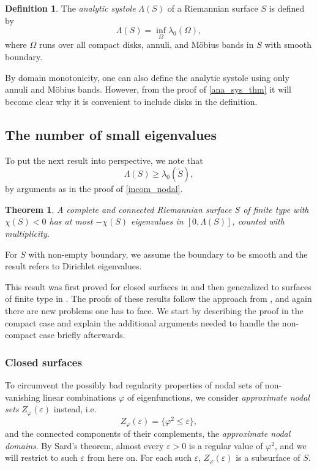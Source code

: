 \documentclass[a4paper,11pt]{amsart}
\numberwithin{equation}{section}
\newtheorem{thm}[equation]{Theorem}
\theoremstyle{definition}
\newtheorem{dfn}[equation]{Definition}
\def\ve{\varepsilon}
\def\vf{\varphi}
\begin{document}
\begin{dfn}
The \emph{analytic systole} $\Lambda(S)$ of a Riemannian surface $S$ is defined by
\begin{equation}
\Lambda(S) = \inf_\Omega \lambda_0(\Omega),
\end{equation}
where $\Omega$ runs over all compact disks, annuli, and M\"obius bands in $S$ with smooth boundary.
\end{dfn}

By domain monotonicity, one can also define the analytic systole using only annuli and M\"obius bands.
However, from the proof of \cref{ana_sys_thm} it will become clear why it is convenient to include disks in the definition.

\subsection{The number of small eigenvalues} \label{secas_small}
To put the next result into perspective, we note that
\begin{equation}\label{broo}
  \Lambda(S)\ge\lambda_0(\tilde S),
\end{equation}
by arguments as in the proof of \cref{incom_nodal}.

\begin{thm}\label{small}
A complete and connected Riemannian surface $S$ of finite type with $\chi(S)<0$ has at most $-\chi(S)$ eigenvalues in $[0,\Lambda(S)]$, counted with multiplicity.
\end{thm}

For $S$ with non-empty boundary, we assume the boundary to be smooth and the result refers to Dirichlet eigenvalues. 

This result was first proved for closed surfaces in \cite[Theorem 1.7]{BMM1} and then generalized to surfaces of finite type in \cite{BMM2}. 
The proofs of these results follow the approach from \cite{OR}, and again there are new problems one has to face. 
We start by describing the proof in the compact case and explain the additional arguments needed to handle the non-compact case briefly afterwards.

\subsubsection{Closed surfaces}
To circumvent the possibly bad regularity properties of nodal sets of non-vanishing linear combinations $\vf$ of eigenfunctions, we consider \emph{approximate nodal sets} $Z_\varphi(\ve)$ instead, i.e.
\begin{equation}
Z_\varphi(\ve)=\{\varphi^2 \leq \ve\},
\end{equation}
and the connected components of their complements, the \emph{approximate nodal domains}.
By Sard's theorem, almost every $\ve>0$ is a regular value of $\vf^2$, and we will restrict to such $\ve$ from here on.
For each such $\ve$, $Z_\varphi(\ve)$ is a subsurface of $S$.
\end{document}
